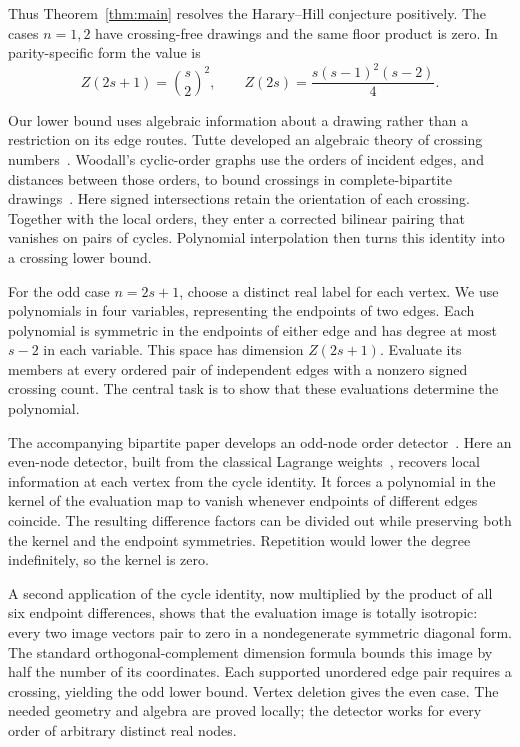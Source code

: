 \documentclass[11pt,a4paper]{article}
\theoremstyle{remark}
\numberwithin{equation}{section}
\begin{document}
Thus Theorem~\ref{thm:main} resolves the Harary--Hill conjecture
positively. The cases \(n=1,2\) have crossing-free drawings and the
same floor product is zero. In parity-specific form the value is
\begin{equation}\label{eq:parity}
Z(2s+1)=\binom{s}{2}^{\!2},
\qquad
Z(2s)=\frac{s(s-1)^2(s-2)}4.
\end{equation}

Our lower bound uses algebraic information about a drawing rather than
a restriction on its edge routes. Tutte developed an algebraic theory
of crossing numbers~\cite{Tutte1970}. Woodall's cyclic-order graphs use
the orders of incident edges, and distances between those orders, to
bound crossings in complete-bipartite drawings~\cite[Sections~2--3]{Woodall1993}.
Here signed intersections retain the orientation of each crossing.
Together with the local orders, they enter a corrected bilinear pairing
that vanishes on pairs of cycles. Polynomial interpolation then turns
this identity into a crossing lower bound.

For the odd case $n=2s+1$, choose a distinct real label for each vertex.
We use polynomials in four variables, representing the endpoints of two
edges. Each polynomial is symmetric in the endpoints of either edge and
has degree at most $s-2$ in each variable. This space has dimension
$Z(2s+1)$. Evaluate its members at every ordered pair of independent
edges with a nonzero signed crossing count. The central task is to show
that these evaluations determine the polynomial.

The accompanying bipartite paper develops an odd-node order
detector~\cite[Section~4]{BipartiteCompanion}.
Here an even-node detector, built from the classical Lagrange
weights~\cite[Sections~2--3]{BerrutTrefethen2004}, recovers local information
at each vertex from the cycle identity. It forces a polynomial in the
kernel of the evaluation map to vanish whenever endpoints of different
edges coincide. The resulting difference factors can be divided out
while preserving both the kernel and the endpoint symmetries. Repetition
would lower the degree indefinitely, so the kernel is zero.

A second application of the cycle identity, now multiplied by the
product of all six endpoint differences, shows that the evaluation
image is totally isotropic: every two image vectors pair to zero in a
nondegenerate symmetric diagonal form. The standard orthogonal-complement
dimension formula bounds this image by half the number of its coordinates.
Each supported unordered edge pair requires a crossing, yielding the
odd lower bound. Vertex deletion gives the even case. The needed geometry
and algebra are proved locally; the detector works for every order of
arbitrary distinct real nodes.
\end{document}

